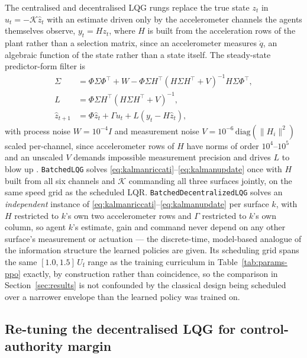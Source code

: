 \documentclass[preprint,11pt,authoryear]{elsarticle}
\newcommand{\Uf}{U_{\mathrm{f}}}
\begin{document}
The centralised and decentralised LQG rungs replace the true state $z_t$ in
$u_t=-\mathcal{K}\hat z_t$ with an estimate driven only by the accelerometer
channels the agents themselves observe, $y_t = H z_t$, where $H$ is built from
the acceleration rows of the plant rather than a selection matrix, since an
accelerometer measures $\ddot q$, an algebraic function of the state rather
than a state itself. The steady-state predictor-form filter is
\begin{align}
\Sigma &= \Phi\Sigma\Phi^{\!\top} + W
- \Phi\Sigma H^{\!\top}\!\left(H\Sigma H^{\!\top}+V\right)^{-1}\! H\Sigma\Phi^{\!\top},
\label{eq:kalmanriccati} \\
L &= \Phi\Sigma H^{\!\top}\!\left(H\Sigma H^{\!\top}+V\right)^{-1}, \\
\hat z_{t+1} &= \Phi\hat z_t + \Gamma u_t + L\left(y_t - H\hat z_t\right),
\label{eq:kalmanupdate}
\end{align}
with process noise $W=10^{-4}I$ and measurement noise
$V=10^{-6}\,\mathrm{diag}(\lVert H_i\rVert^2)$ scaled per-channel, since
accelerometer rows of $H$ have norms of order $10^4$--$10^5$ and an unscaled
$V$ demands impossible measurement precision and drives $L$ to blow up
\citep{anderson2007optimal}. \texttt{BatchedLQG} solves
\eqref{eq:kalmanriccati}--\eqref{eq:kalmanupdate} once with $H$ built from all
six channels and $\mathcal{K}$ commanding all three surfaces jointly, on the
same speed grid as the scheduled LQR. \texttt{Batched\-Decentralized\-LQG}
solves an \emph{independent} instance of
\eqref{eq:kalmanriccati}--\eqref{eq:kalmanupdate} per surface $k$, with $H$
restricted to $k$'s own two accelerometer rows and $\Gamma$ restricted to $k$'s
own column, so agent $k$'s estimate, gain and command never depend on any
other surface's measurement or actuation --- the discrete-time, model-based
analogue of the information structure the learned policies are given. Its
scheduling grid spans the same $[1.0,1.5]\,\Uf$ range as the training
curriculum in Table~\ref{tab:params-ppo} exactly, by construction rather than
coincidence, so the comparison in Section~\ref{sec:results} is not confounded
by the classical design being scheduled over a narrower envelope than the
learned policy was trained on.

\subsection{Re-tuning the decentralised LQG for control-authority margin}
\label{app:robust}
\end{document}
